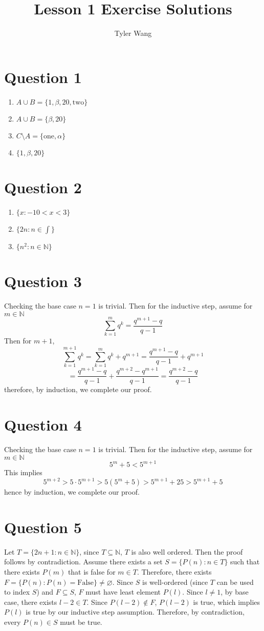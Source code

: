 \documentclass[11pt]{article}
\title {Lesson 1 Exercise Solutions}
\author {Tyler Wang}
\numberwithin{lemma}{section}
\numberwithin{equation}{section}
\numberwithin{prop}{section}
\def\nat{\mathbb{N}}
\def\sec#1{\section*{#1}\addtocounter{section}{1}\setcounter{subsection}{0}}
\begin{document}
\sec{Question 1}
\begin{enumerate}
	\item $A\cup B=\{1,\beta,20,\text{two}\}$
	\item $A\cup B=\{\beta,20\}$
	\item $C\setminus A=\{\text{one},\alpha\}$
	\item $\{1,\beta,20\}$
\end{enumerate}

\sec{Question 2}
\begin{enumerate}
	\item $\{x:-10<x<3\}$
	\item $\{2n:n\in\int\}$
	\item $\{n^2:n\in\nat\}$
\end{enumerate}

\sec{Question 3}
Checking the base case $n=1$ is trivial.
Then for the inductive step, assume for $m\in\nat$
$$\sum^m_{k=1}q^k=\frac{q^{m+1}-q}{q-1}$$
Then for $m+1$,
$$\sum^{m+1}_{k=1}q^k=\sum^m_{k=1}q^k+q^{m+1}
=\frac{q^{m+1}-q}{q-1}+q^{m+1}$$
$$=\frac{q^{m+1}-q}{q-1}+\frac{q^{m+2}-q^{m+1}}{q-1}=\frac{q^{m+2}-q}{q-1}$$
therefore, by induction, we complete our proof.
\sec{Question 4}
Checking the base case $n=1$ is trivial.
Then for the inductive step, assume for $m\in\nat$
$$5^m+5<5^{m+1}$$
This implies
$$5^{m+2}>5\cdot 5^{m+1}>5(5^m+5)>5^{m+1}+25>5^{m+1}+5$$
hence by induction, we complete our proof.

\sec{Question 5}
Let $T=\{2n+1:n\in\nat\}$, since $T\subseteq\nat$, $T$ is also well ordered. Then the proof follows by contradiction. 
Assume there exists a set $S=\{P(n):n\in T\}$ such that there exists $P(m)$ that is false for $m\in T$. 
Therefore, there exists $F=\{P(n):P(n)=\text{False}\}\neq \varnothing$. Since $S$ is well-ordered (since $T$ can be used to index $S$) and $F\subseteq S$, $F$ must have least element $P(l)$. Since $l\neq1$, by base case, there exists $l-2\in T$. Since $P(l-2)\notin F$, $P(l-2)$ is true, which implies $P(l)$ is true by our inductive step assumption. Therefore, by contradiction, every $P(n)\in S$ must be true.
\end{document}
